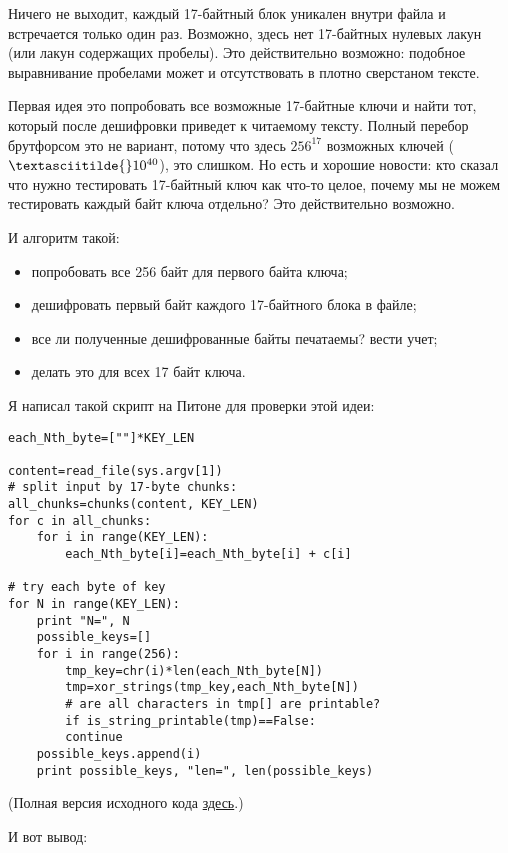 Ничего не выходит, каждый 17-байтный блок уникален внутри файла и встречается только один раз.
Возможно, здесь нет 17-байтных нулевых лакун (или лакун содержащих пробелы).
Это действительно возможно: подобное выравнивание пробелами может и отсутствовать в плотно сверстаном тексте.

Первая идея это попробовать все возможные 17-байтные ключи и найти тот, который после дешифровки приведет к читаемому тексту.
Полный перебор брутфорсом это не вариант, потому что здесь $256^{17}$ возможных ключей ($\textasciitilde{}10^{40}$),
это слишком.
Но есть и хорошие новости: кто сказал что нужно тестировать 17-байтный ключ как что-то целое, почему мы не можем тестировать
каждый байт ключа отдельно?
Это действительно возможно.

И алгоритм такой:

\begin{itemize}
\item попробовать все 256 байт для первого байта ключа;
\item дешифровать первый байт каждого 17-байтного блока в файле;
\item все ли полученные дешифрованные байты печатаемы? вести учет;
\item делать это для всех 17 байт ключа.
\end{itemize}

Я написал такой скрипт на Питоне для проверки этой идеи:

\begin{lstlisting}[caption=Python script,style=custompy]
each_Nth_byte=[""]*KEY_LEN

content=read_file(sys.argv[1])
# split input by 17-byte chunks:
all_chunks=chunks(content, KEY_LEN)
for c in all_chunks:
    for i in range(KEY_LEN):
        each_Nth_byte[i]=each_Nth_byte[i] + c[i]

# try each byte of key
for N in range(KEY_LEN):
    print "N=", N
    possible_keys=[]
    for i in range(256):
        tmp_key=chr(i)*len(each_Nth_byte[N])
        tmp=xor_strings(tmp_key,each_Nth_byte[N])
        # are all characters in tmp[] are printable?
        if is_string_printable(tmp)==False:
	    continue
	possible_keys.append(i)
    print possible_keys, "len=", len(possible_keys)
\end{lstlisting}

(Полная версия исходного кода \href{https://github.com/DennisYurichev/RE-for-beginners/blob/master/ff/XOR/mask_2/files/decrypt2.py}{здесь}.)

И вот вывод:

